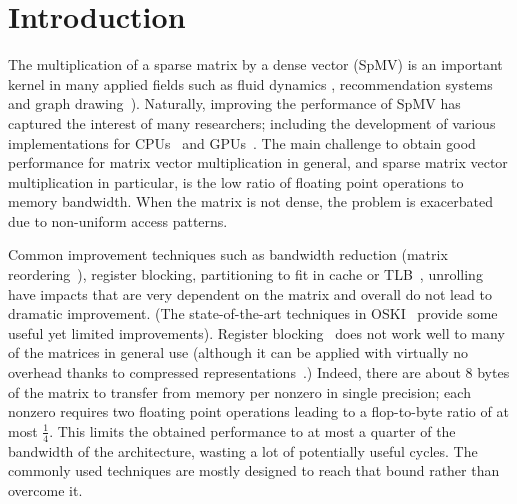 \documentclass{sig-alternate}
\def\NOTE#1{{}}
\def\ge#1{{#1}}
\begin{document}
\section{Introduction}
The multiplication of a sparse matrix by a dense vector (SpMV) is an
important kernel in many applied fields such as fluid dynamics 
\cite{journals/tog/BolzFGS03}, recommendation systems~\cite{Brin98} and graph
drawing~\cite{Koren05}). Naturally, improving the performance of SpMV has
captured the interest of many researchers; including the development of
various implementations for 
CPUs~\cite{Buluc2009SPAA,Williams07} and GPUs~\cite{Bell08,
  conf/ipps/KreutzerHWFBB12,
  journals/concurrency/VazquezFG11,kumar2012accelerating}. \ge{The main
challenge  to obtain good performance for matrix vector multiplication in general, and 
sparse matrix vector multiplication in particular, is the low ratio of floating point operations
to memory bandwidth. When the matrix is not dense, the problem is exacerbated due to non-uniform 
access patterns.}

\NOTE{I rewrote last few sentences: write more precisely? Blas 2 is Matrix/vector, and that is still somewhat memory bound.}

Common improvement techniques such as  bandwidth
reduction (matrix reordering~\cite{Cuthill69}), register blocking, partitioning to fit in
cache or TLB~\cite{Nishtala07,Temam:1992:CBS:147877.148091,conf/ppsc/Toledo97},
unrolling~\cite{Mellor-Crummey04} have impacts that are very
dependent on the matrix and overall do not lead to dramatic
improvement. (The state-of-the-art techniques in OSKI~\cite{Vuduc05}
provide some useful yet limited improvements). Register blocking~\cite{conf/ppsc/Toledo97} does
not work well to many of the matrices in general use (although it can be applied
with virtually no overhead thanks to compressed
representations~\cite{Buluc11}.) Indeed, there are about 8 bytes of the matrix to transfer
from memory 
per nonzero in single precision; each nonzero requires two
floating point operations leading to a flop-to-byte ratio of at most
$\frac{1}{4}$. This limits the obtained performance to at most a
quarter of the bandwidth of the architecture, wasting a lot of
potentially useful cycles. The commonly used techniques are mostly
designed to reach that bound rather than overcome it.
\end{document}
